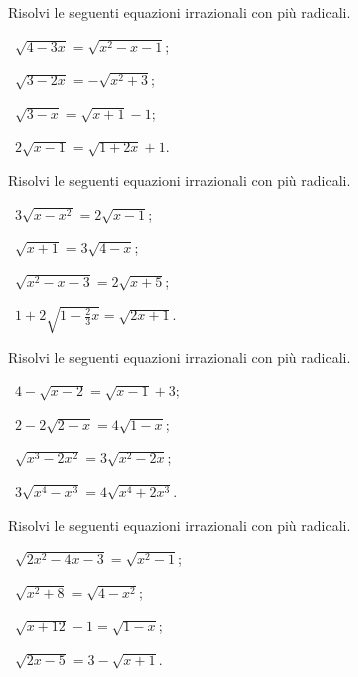\begin{esercizio}[\Ast]
 \label{ese:8.11}
Risolvi le seguenti equazioni irrazionali con più radicali.
\begin{multicols}{2}
 \begin{enumeratea}
 \item~$\sqrt{4-3x}=\sqrt{x^2-x-1}$;
 \item~$\sqrt{3-2x}=-\sqrt{x^2+3}$;
 \item~$\sqrt{3-x}=\sqrt{x+1}-1$;
 \item~$2\sqrt{x-1}=\sqrt{1+2x}+1$.
 \end{enumeratea}
 \end{multicols}
\end{esercizio}

\begin{esercizio}[\Ast]
 \label{ese:8.12}
Risolvi le seguenti equazioni irrazionali con più radicali.
\begin{multicols}{2}
 \begin{enumeratea}
 \item~$3\sqrt{x-x^2}=2\sqrt{x-1}$;
 \item~$\sqrt{x+1}=3\sqrt{4-x}$;
 \item~$\sqrt{x^2-x-3}=2\sqrt{x+5}$;
 \item~$1+2\sqrt{1-\frac 2 3x}=\sqrt{2x+1}$.
 \end{enumeratea}
 \end{multicols}
\end{esercizio}

\begin{esercizio}[\Ast]
 \label{ese:8.13}
Risolvi le seguenti equazioni irrazionali con più radicali.
\begin{multicols}{2}
 \begin{enumeratea}
 \item~$4-\sqrt{x-2}=\sqrt{x-1}+3$;
 \item~$2-2\sqrt{2-x}=4\sqrt{1-x}$;
 \item~$\sqrt{x^3-2x^2}=3\sqrt{x^2-2x}$;
 \item~$3\sqrt{x^4-x^3}=4\sqrt{x^4+2x^3}$.
 \end{enumeratea}
 \end{multicols}
\end{esercizio}

\begin{esercizio}[\Ast]
 \label{ese:8.14}
Risolvi le seguenti equazioni irrazionali con più radicali.
\begin{multicols}{2}
 \begin{enumeratea}
 \item~$\sqrt{2x^2-4x-3}=\sqrt{x^2-1}$;
 \item~$\sqrt{x^2+8}=\sqrt{4-x^2}$;
 \item~$\sqrt{x+12}-1=\sqrt{1-x}$;
 \item~$\sqrt{2x-5}=3-\sqrt{x+1}$.
 \end{enumeratea}
 \end{multicols}
\end{esercizio}

